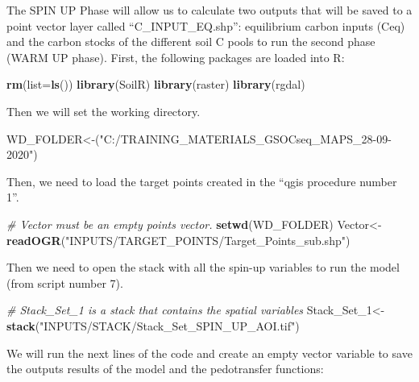\documentclass[
  10pt,
  b5paper,
]{book}
\newenvironment{Shaded}{\begin{snugshade}}{\end{snugshade}}
\newcommand{\CommentTok}[1]{\textcolor[rgb]{0.56,0.35,0.01}{\textit{#1}}}
\newcommand{\DataTypeTok}[1]{\textcolor[rgb]{0.13,0.29,0.53}{#1}}
\newcommand{\DecValTok}[1]{\textcolor[rgb]{0.00,0.00,0.81}{#1}}
\newcommand{\KeywordTok}[1]{\textcolor[rgb]{0.13,0.29,0.53}{\textbf{#1}}}
\newcommand{\NormalTok}[1]{#1}
\newcommand{\StringTok}[1]{\textcolor[rgb]{0.31,0.60,0.02}{#1}}
\begin{document}
The SPIN UP Phase will allow us to calculate two outputs that will be saved to a point vector layer called ``C\_INPUT\_EQ.shp'': equilibrium carbon inputs (Ceq) and the carbon stocks of the different soil C pools to run the
second phase (WARM UP phase).
First, the following packages are loaded into R:

\begin{Shaded}
\begin{Highlighting}[]
\KeywordTok{rm}\NormalTok{(}\DataTypeTok{list=}\KeywordTok{ls}\NormalTok{()) }
\KeywordTok{library}\NormalTok{(SoilR)}
\KeywordTok{library}\NormalTok{(raster)}
\KeywordTok{library}\NormalTok{(rgdal)}
\end{Highlighting}
\end{Shaded}

Then we will set the working directory.

\begin{Shaded}
\begin{Highlighting}[]
\NormalTok{WD_FOLDER<-(}\StringTok{"C:/TRAINING_MATERIALS_GSOCseq_MAPS_28-09-2020"}\NormalTok{)}
\end{Highlighting}
\end{Shaded}

Then, we need to load the target points created in the ``qgis procedure number 1''.

\begin{Shaded}
\begin{Highlighting}[]
\CommentTok{# Vector must be an empty points vector. }
\KeywordTok{setwd}\NormalTok{(WD_FOLDER)}
\NormalTok{Vector<-}\KeywordTok{readOGR}\NormalTok{(}\StringTok{"INPUTS/TARGET_POINTS/Target_Points_sub.shp"}\NormalTok{)}
\end{Highlighting}
\end{Shaded}

Then we need to open the stack with all the spin-up variables to run the model (from script number 7).

\begin{Shaded}
\begin{Highlighting}[]
\CommentTok{# Stack_Set_1 is a stack that contains the spatial variables }
\NormalTok{Stack_Set_}\DecValTok{1}\NormalTok{<-}\StringTok{ }\KeywordTok{stack}\NormalTok{(}\StringTok{"INPUTS/STACK/Stack_Set_SPIN_UP_AOI.tif"}\NormalTok{)}
\end{Highlighting}
\end{Shaded}

We will run the next lines of the code and create an empty vector variable to save the outputs results of the model and the pedotransfer functions:
\end{document}

